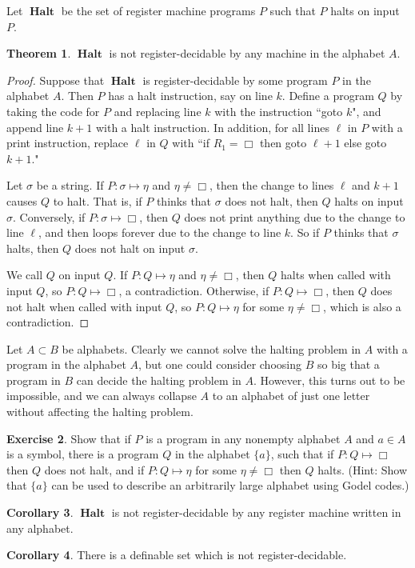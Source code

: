 \documentclass[12pt]{report}
\DeclareMathOperator{\Halt}{\mathbf{Halt}}
\theoremstyle{definition}
\newtheorem{theorem}{Theorem}[chapter]
\newtheorem{corollary}[theorem]{Corollary}
\newtheorem{exercise}[theorem]{Exercise}
\begin{document}
Let $\Halt$ be the set of register machine programs $P$ such that $P$ halts on input $P$.
\begin{theorem}
$\Halt$ is not register-decidable by any machine in the alphabet $A$.
\end{theorem}
\begin{proof}
Suppose that $\Halt$ is register-decidable by some program $P$ in the alphabet $A$. Then $P$ has a halt instruction, say on line $k$. Define a program $Q$ by taking the code for $P$ and replacing line $k$ with the instruction ``goto $k$", and append line $k+1$ with a halt instruction. In addition, for all lines $\ell$ in $P$ with a print instruction, replace $\ell$ in $Q$ with ``if $R_1 = \Box$ then goto $\ell + 1$ else goto $k+1$."

Let $\sigma$ be a string. If $P: \sigma \mapsto \eta$ and $\eta \neq \Box$, then the change to lines $\ell$ and $k+1$ causes $Q$ to halt. That is, if $P$ thinks that $\sigma$ does not halt, then $Q$ halts on input $\sigma$. Conversely, if $P: \sigma \mapsto \Box$, then $Q$ does not print anything due to the change to line $\ell$, and then loops forever due to the change to line $k$. So if $P$ thinks that $\sigma$ halts, then $Q$ does not halt on input $\sigma$.

We call $Q$ on input $Q$. If $P: Q \mapsto \eta$ and $\eta \neq \Box$, then $Q$ halts when called with input $Q$, so $P: Q \mapsto \Box$, a contradiction. Otherwise, if $P: Q \mapsto \Box$, then $Q$ does not halt when called with input $Q$, so $P: Q \mapsto \eta$ for some $\eta \neq \Box$, which is also a contradiction.
\end{proof}

Let $A \subset B$ be alphabets. Clearly we cannot solve the halting problem in $A$ with a program in the alphabet $A$, but one could consider choosing $B$ so big that a program in $B$ can decide the halting problem in $A$. However, this turns out to be impossible, and we can always collapse $A$ to an alphabet of just one letter without affecting the halting problem.
\begin{exercise}
Show that if $P$ is a program in any nonempty alphabet $A$ and $a \in A$ is a symbol, there is a program $Q$ in the alphabet $\{a\}$, such that if $P: Q \mapsto \Box$ then $Q$ does not halt, and if $P: Q \mapsto \eta$ for some $\eta \neq \Box$ then $Q$ halts. (Hint: Show that $\{a\}$ can be used to describe an arbitrarily large alphabet using Godel codes.)
\end{exercise}
\begin{corollary}
$\Halt$ is not register-decidable by any register machine written in any alphabet.
\end{corollary}
\begin{corollary}
There is a definable set which is not register-decidable.
\end{corollary}
\end{document}
